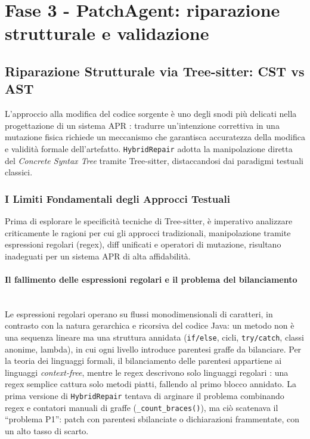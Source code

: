 \section{Fase 3 - PatchAgent: riparazione strutturale e validazione}
\label{sec:fase3-validazione}

\subsection{Riparazione Strutturale via Tree-sitter: CST vs AST}
\label{subsec:3.4.5}
L'approccio alla modifica del codice sorgente è uno degli snodi più delicati nella progettazione di un sistema
APR \cite{huang2024evolving}: tradurre un'intenzione correttiva in una mutazione fisica richiede un meccanismo che
garantisca accuratezza della modifica e validità formale dell'artefatto. \texttt{HybridRepair} adotta la
manipolazione diretta del \textit{Concrete Syntax Tree} tramite Tree-sitter, distaccandosi dai paradigmi testuali classici.
\subsubsection{I Limiti Fondamentali degli Approcci Testuali}
\label{subsubsec:3.4.5.1}
Prima di esplorare le specificità tecniche di Tree-sitter, è imperativo
analizzare criticamente le ragioni per cui gli approcci tradizionali,
manipolazione tramite espressioni regolari (regex), diff unificati e operatori di mutazione,
risultano inadeguati per un sistema APR di alta affidabilità.

\paragraph{Il fallimento delle espressioni regolari e il problema del bilanciamento}\mbox{}\\
Le espressioni regolari operano su flussi monodimensionali di caratteri, in contrasto con la natura gerarchica e
ricorsiva del codice Java: un metodo non è una sequenza lineare ma una struttura annidata (\texttt{if/else}, cicli,
\texttt{try/catch}, classi anonime, lambda), in cui ogni livello introduce parentesi graffe da bilanciare. Per la
teoria dei linguaggi formali, il bilanciamento delle parentesi appartiene ai linguaggi \textit{context-free},
mentre le regex descrivono solo linguaggi regolari \cite{aho2006compilers}: una regex semplice cattura solo metodi
piatti, fallendo al primo blocco annidato. La prima versione di \texttt{HybridRepair} tentava di arginare il
problema combinando regex e contatori manuali di graffe (\texttt{\_count\_braces()}), ma ciò scatenava il
``problema P1'': patch con parentesi sbilanciate o dichiarazioni frammentate, con un alto tasso di scarto.

